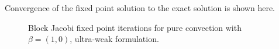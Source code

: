 \documentclass{article}
\begin{document}
Convergence of the fixed point solution to the exact solution is shown here.
\begin{figure}
\centering
{}
\caption{Block Jacobi fixed point iterations for pure convection with $\beta = (1,0)$, ultra-weak formulation.}
\end{figure}
\end{document}
